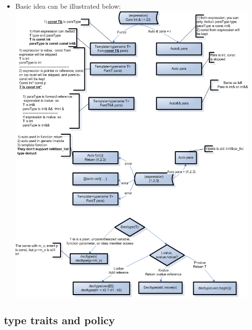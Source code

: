 \documentclass[a4paper,12pt,twoside]{book}
\begin{document}
\begin{itemize}
	\item Basic idea can be illustrated below:
	\includegraphics[scale=0.8]{pics/type_deduct.png}
\end{itemize}
\subsection{type traits and policy}
\end{document}
